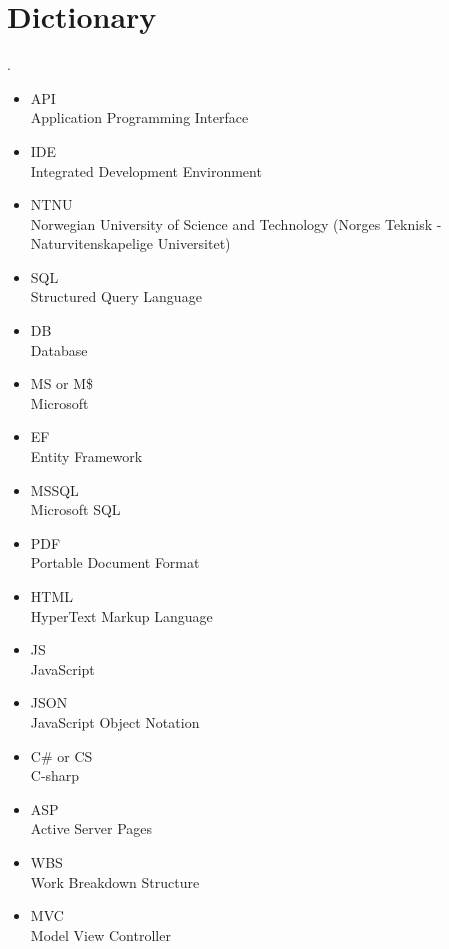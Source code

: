 \section{Dictionary}.
\begin{itemize}
\item API \\ Application Programming Interface
\item IDE \\ Integrated Development Environment
\item NTNU \\ Norwegian University of Science and Technology (Norges Teknisk - Naturvitenskapelige Universitet)
\item SQL \\ Structured Query Language 
\item DB \\ Database 
\item MS or M\$ \\ Microsoft
\item EF \\ Entity Framework
\item MSSQL \\ Microsoft SQL
\item PDF \\ Portable Document Format
\item HTML \\ HyperText Markup Language
\item JS \\ JavaScript
\item JSON \\ JavaScript Object Notation
\item C\# or CS\\ C-sharp
\item ASP \\ Active Server Pages
\item WBS \\ Work Breakdown Structure
\item MVC \\ Model View Controller
\end{itemize}




